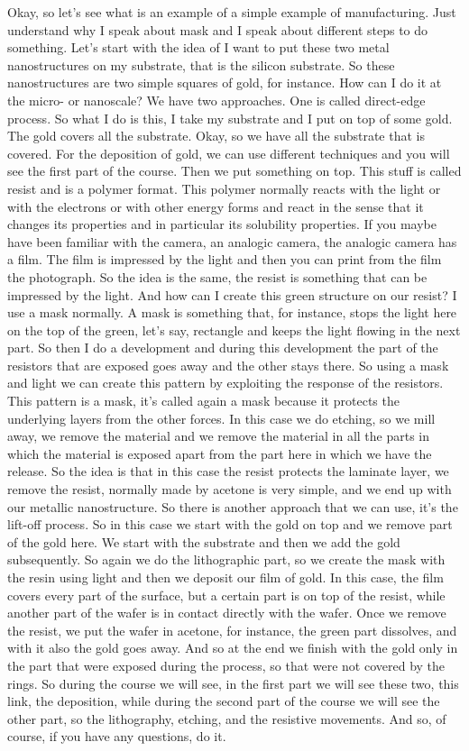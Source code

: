Okay, so let's see what is an example of a simple example of manufacturing. Just understand why I speak about mask and I speak about different steps to do something. Let's start with the idea of I want to put these two metal nanostructures on my substrate, that is the silicon substrate. So these nanostructures are two simple squares of gold, for instance. How can I do it at the micro- or nanoscale? We have two approaches. One is called direct-edge process. So what I do is this, I take my substrate and I put on top of some gold. The gold covers all the substrate. Okay, so we have all the substrate that is covered. For the deposition of gold, we can use different techniques and you will see the first part of the course. Then we put something on top. This stuff is called resist and is a polymer format. This polymer normally reacts with the light or with the electrons or with other energy forms and react in the sense that it changes its properties and in particular its solubility properties. If you maybe have been familiar with the camera, an analogic camera, the analogic camera has a film. The film is impressed by the light and then you can print from the film the photograph. So the idea is the same, the resist is something that can be impressed by the light. And how can I create this green structure on our resist? I use a mask normally. A mask is something that, for instance, stops the light here on the top of the green, let's say, rectangle and keeps the light flowing in the next part. So then I do a development and during this development the part of the resistors that are exposed goes away and the other stays there. So using a mask and light we can create this pattern by exploiting the response of the resistors. This pattern is a mask, it's called again a mask because it protects the underlying layers from the other forces. In this case we do etching, so we mill away, we remove the material and we remove the material in all the parts in which the material is exposed apart from the part here in which we have the release. So the idea is that in this case the resist protects the laminate layer, we remove the resist, normally made by acetone is very simple, and we end up with our metallic nanostructure. So there is another approach that we can use, it's the lift-off process. So in this case we start with the gold on top and we remove part of the gold here. We start with the substrate and then we add the gold subsequently. So again we do the lithographic part, so we create the mask with the resin using light and then we deposit our film of gold. In this case, the film covers every part of the surface, but a certain part is on top of the resist, while another part of the wafer is in contact directly with the wafer. Once we remove the resist, we put the wafer in acetone, for instance, the green part dissolves, and with it also the gold goes away. And so at the end we finish with the gold only in the part that were exposed during the process, so that were not covered by the rings. So during the course we will see, in the first part we will see these two, this link, the deposition, while during the second part of the course we will see the other part, so the lithography, etching, and the resistive movements. And so, of course, if you have any questions, do it.
